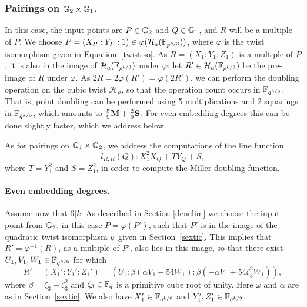 \subsubsection{Pairings on $\mathbb{G}_{2} \times \mathbb{G}_{1}$.}

In this case,
the input points are
$P \in \mathbb{G}_{2}$ and $Q \in \mathbb{G}_{1}$, and
$R$ will be a multiple of $P$.
We choose $P = (X_P:Y_P:1) \in \varphi(\mathcal{H}_a(\mathbb{F}_{p^{k/3}}))$, where $\varphi$
is the twist isomorphism given in Equation~\ref{twistiso}.
As $R=(X_1 : Y_1 : Z_1)$ is a multiple of $P$, it is also in the image of $\mathcal{H}_a(\mathbb{F}_{p^{k/3}})$ under $\varphi$; 
let $R' \in \mathcal{H}_a(\mathbb{F}_{p^{k/3}})$ be the pre-image of $R$ under $\varphi$.
As $2R = 2\varphi(R') = \varphi(2R')$, 
we can perform the doubling operation on the cubic twist $\mathcal{H}_a$, 
so that the operation count occurs in $\mathbb{F}_{q^{k/3}}$.
That is, point doubling can be performed using 5 multiplications and 2 squarings in $\mathbb{F}_{q^{k/3}}$, which amounts to $\frac{5}{9}\textbf{M} + \frac{2}{9}\textbf{S}$.
For even embedding degrees this can be done slightly faster, which we address below.

As for pairings on $\mathbb{G}_{1} \times \mathbb{G}_{2}$, 
we address the computations of the line function 
\begin{equation}\label{l2R}
l_{R,R}(Q): X_1^2 X_Q + T Y_Q + S,
\end{equation}
where $T = Y_1^2$ and $S = Z_1^2$,
in order to compute the Miller doubling function.

\paragraph*{Even embedding degrees.}

Assume now that $6|k$. 
As described in Section \ref{denelim}
we choose the input point from $\mathbb{G}_{2}$, 
in this case $P = \varphi(P')$, such that $P'$ is
in the image of the quadratic twist isomorphism $\psi$ given in 
Section~\ref{sextic}. 
This implies that $R' = \varphi^{-1}(R)$, 
as a multiple of $P'$, also lies in this image, 
so that there exist $U_1, V_1, W_1 \in \mathbb{F}_{q^{k/6}}$ for which
\begin{equation}\label{Rprime}
R' = (X_1':Y_1':Z_1') = (U_1:\beta(\alpha V_1 - 54W_1) : \beta(-\alpha V_1 + 54\zeta_3^2 W_1)),
\end{equation}
where $\beta = \zeta_3-\zeta_3^2$ and 
$\zeta_3 \in \mathbb{F}_{q}$ is a primitive cube root of unity.
Here $\omega$ and $\alpha$ are as in Section~\ref{sextic}.
We also have $X_1' \in \mathbb{F}_{q^{k/6}}$ and
$Y_1',Z_1' \in \mathbb{F}_{q^{k/3}}$.

